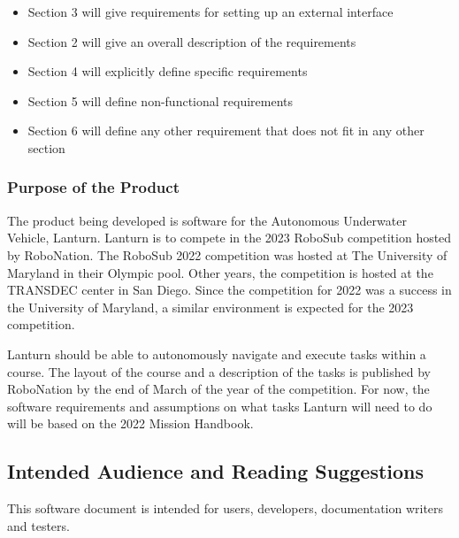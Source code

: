 \begin{itemize}
    \item Section 3 will give requirements for setting up an external interface 
    \item Section 2 will give an overall description of the requirements 
    \item Section 4 will explicitly define specific requirements 
    \item Section 5 will define non-functional requirements 
    \item Section 6 will define any other requirement that does not fit in any other section 
\end{itemize}

\subsubsection{Purpose of the Product}

The product being developed is software for the Autonomous Underwater Vehicle,
Lanturn. Lanturn is to compete in the 2023 RoboSub competition hosted by
RoboNation. The RoboSub 2022 competition was hosted at The University of
Maryland in their Olympic pool. Other years, the competition is hosted at the
TRANSDEC center in San Diego. Since the competition for 2022 was a success in
the University of Maryland, a similar environment is expected for the 2023
competition. 
\par

Lanturn should be able to autonomously navigate and execute tasks within a
course. The layout of the course and a description of the tasks is published by
RoboNation by the end of March of the year of the competition. For now, the
software requirements and assumptions on what tasks Lanturn will need to do
will be based on the 2022 Mission Handbook.
\par

\subsection{Intended Audience and Reading Suggestions}
\label{sec:audience}

This software document is intended for users, developers, documentation writers
and testers. 

